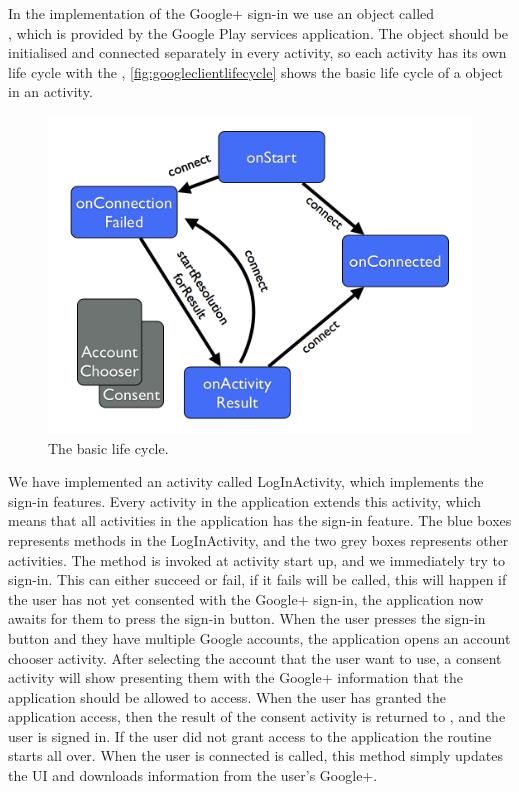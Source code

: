 In the implementation of the Google+ sign-in we use an object called \\\citep{googleapiclient-docs}, which is provided by the Google Play services application. 
The object  should be initialised and connected separately in every activity, so each activity has its own life cycle with the , \autoref{fig:googleclientlifecycle} shows the basic life cycle of a  object in an activity.
\begin{figure}[H]
\centering
\includegraphics[width=0.75\linewidth]{img/googleclientflow.png}
\caption{The  basic life cycle.\cite{googleapiclient-lifecycle}}
\label{fig:googleclientlifecycle}
\end{figure}
We have implemented an activity called LogInActivity, which implements the sign-in features. Every activity in the application extends this activity, which means that all activities in the application has the sign-in feature. 
The blue boxes represents methods in the LogInActivity, and the two grey boxes represents other activities. The method  is invoked at activity start up, and we immediately try to sign-in. 
This can either succeed or fail, if it fails  will be called, this will happen if the user has not yet consented with the Google+ sign-in, the application now awaits for them to press the sign-in button. 
When the user presses the sign-in button and they have multiple Google accounts, the application opens an account chooser activity.
After selecting the account that the user want to use, a consent activity will show presenting them with the Google+ information that the application should be allowed to access. 
When the user has granted the application access, then the result of the consent activity is returned to , and the user is signed in. 
If the user did not grant access to the application the routine starts all over. When the user is connected  is called, this method simply updates the UI and downloads information from the user's Google+.

